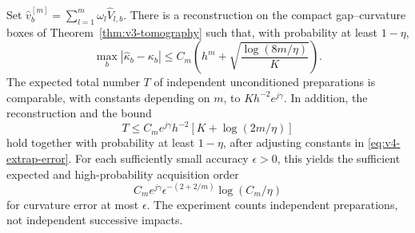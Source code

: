 \begin{theorem}
\label{thm:v4-acquisition}
Set $\widehat v_b^{[m]}=\sum_{l=1}^m\omega_l\widehat V_{l,b}$.
There is a reconstruction on the compact gap--curvature boxes of
Theorem~\ref{thm:v3-tomography} such that, with probability at least
$1-\eta$,
\begin{equation}\label{eq:v4-extrap-error}
 \max_b|\widehat\kappa_b-\kappa_b|
 \le C_m\left(h^m+\sqrt{\frac{\log(8m/\eta)}K}\right).
\end{equation}
The expected total number $T$ of independent unconditioned
preparations is comparable, with constants depending on $m$, to
$Kh^{-2}e^{j\gamma}$. In addition, the reconstruction and the bound
\begin{equation}\label{eq:v4-highprob-cost}
 T\le C_m e^{j\gamma}h^{-2}[K+\log(2m/\eta)]
\end{equation}
hold together with probability at least $1-\eta$, after adjusting
constants in \eqref{eq:v4-extrap-error}. For each sufficiently small
accuracy $\epsilon>0$, this yields the sufficient expected and
high-probability acquisition order
\begin{equation}\label{eq:v4-accuracy-cost}
 C_m e^{j\gamma}\epsilon^{-(2+2/m)}\log(C_m/\eta)
\end{equation}
for curvature error at most $\epsilon$. The experiment counts
independent preparations, not independent successive impacts.
\end{theorem}
